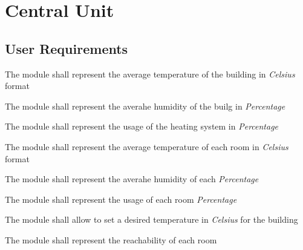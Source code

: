 \section{Central Unit}
\subsection{User Requirements}
\begin{req_enum}
	\item The module shall represent the average temperature of the building in \textit{Celsius} format
	\item The module shall represent the averahe humidity of the builg in \textit{Percentage}
	\item The module shall represent the usage of the heating system in \textit{Percentage}
	\item The module shall represent the average temperature of each room in \textit{Celsius} format
	\item The module shall represent the averahe humidity of each \textit{Percentage}
	\item The module shall represent the usage of each room \textit{Percentage}
	\item The module shall allow to set a desired temperature in \textit{Celsius} for the building
	\item The module shall represent the reachability of each room
\end{req_enum}

